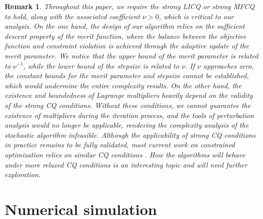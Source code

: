 \documentclass[11pt]{article}
\newtheorem{remark}{Remark}
\begin{document}
\begin{remark}
    Throughout this paper, we require the strong LICQ or strong MFCQ to hold, along with the associated coefficient \(\nu > 0\), which is critical to our analysis. On the one hand, the design of our algorithm relies on the sufficient descent property of the merit function, where the balance between the objective function and constraint violation is achieved through the  adaptive update of the merit parameter. We notice that the upper bound of the merit parameter is related to \(\nu^{-1}\), while the lower bound of the stepsize is related to \(\nu\). If \(\nu\) approaches zero, the constant bounds for the merit parameter and stepsize cannot be established, which would undermine the entire complexity results. On the other hand, the existence and boundedness of Lagrange multipliers heavily depend on the validity of the strong CQ conditions. Without these conditions, we cannot guarantee the existence of multipliers during the iteration process, and the tools of perturbation analysis would no longer be applicable, rendering the complexity analysis of the stochastic algorithm infeasible. Although the applicability of strong CQ conditions in practice remains to be fully validated, most current work on constrained optimization relies on similar CQ conditions \cite{boob2025level,curtis2024worst,jia2025first,jin2022stochastic,li2021rate,sahin2019inexact,shi2025momentum}. How  the algorithms will behave under more relaxed CQ conditions is an interesting topic and will need further exploration.
\end{remark}

\section{Numerical simulation}\label{sec:num-sim}
\end{document}
